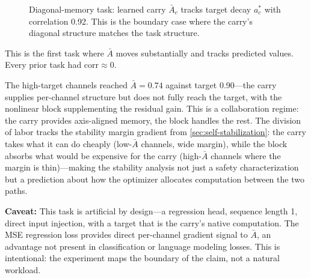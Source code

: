\documentclass[11pt]{article}
\begin{document}
\begin{figure}[ht]
\centering
{}
\caption{Diagonal-memory task: learned carry $\bar{A}_c$ tracks target decay $a^*_c$ with correlation 0.92. This is the boundary case where the carry's diagonal structure matches the task structure.}
\label{fig:diagonal-memory}
\end{figure}

This is the first task where $\bar{A}$ moves substantially and tracks predicted values. Every prior task had $\text{corr} \approx 0$.

The high-target channels reached $\bar{A} = 0.74$ against target 0.90---the carry supplies per-channel structure but does not fully reach the target, with the nonlinear block supplementing the residual gain. This is a collaboration regime: the carry provides axis-aligned memory, the block handles the rest. The division of labor tracks the stability margin gradient from \cref{sec:self-stabilization}: the carry takes what it can do cheaply (low-$\bar{A}$ channels, wide margin), while the block absorbs what would be expensive for the carry (high-$\bar{A}$ channels where the margin is thin)---making the stability analysis not just a safety characterization but a prediction about how the optimizer allocates computation between the two paths.

\textbf{Caveat:} This task is artificial by design---a regression head, sequence length 1, direct input injection, with a target that is the carry's native computation. The MSE regression loss provides direct per-channel gradient signal to $\bar{A}$, an advantage not present in classification or language modeling losses. This is intentional: the experiment maps the boundary of the claim, not a natural workload.
\end{document}
